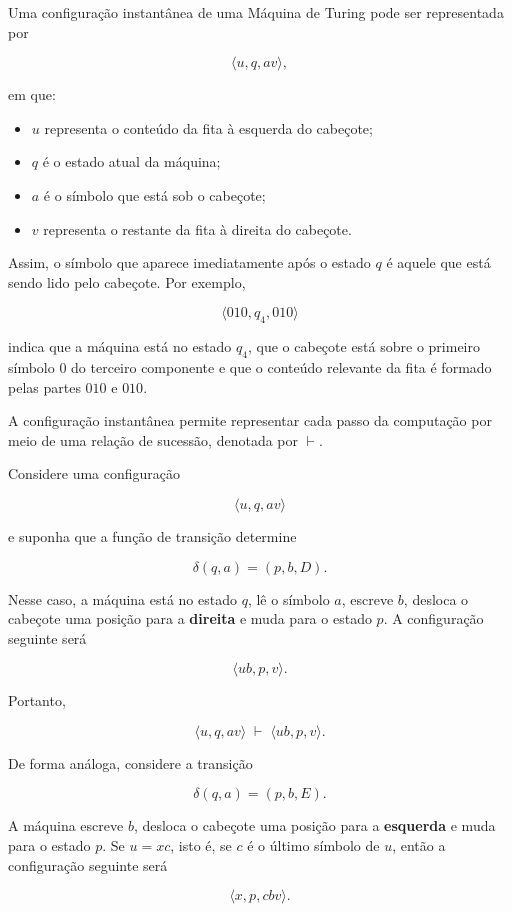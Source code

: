 \documentclass[
  brazilian,
  letterpaper,
]{book}
\providecommand{\tightlist}{%
  \setlength{\itemsep}{0pt}\setlength{\parskip}{0pt}}
\theoremstyle{plain}
\theoremstyle{definition}
\theoremstyle{remark}
\begin{document}
Uma configuração instantânea de uma Máquina de Turing pode ser
representada por

\[
\langle u,q,av\rangle,
\]

em que:

\begin{itemize}
\tightlist
\item
  \(u\) representa o conteúdo da fita à esquerda do cabeçote;
\item
  \(q\) é o estado atual da máquina;
\item
  \(a\) é o símbolo que está sob o cabeçote;
\item
  \(v\) representa o restante da fita à direita do cabeçote.
\end{itemize}

Assim, o símbolo que aparece imediatamente após o estado \(q\) é aquele
que está sendo lido pelo cabeçote. Por exemplo,

\[
\langle 010,q_4,010\rangle
\]

indica que a máquina está no estado \(q_4\), que o cabeçote está sobre o
primeiro símbolo \(0\) do terceiro componente e que o conteúdo relevante
da fita é formado pelas partes \(010\) e \(010\).

A configuração instantânea permite representar cada passo da computação
por meio de uma relação de sucessão, denotada por \(\vdash\).

Considere uma configuração

\[
\langle u,q,av\rangle
\]

e suponha que a função de transição determine

\[
\delta(q,a)=(p,b,D).
\]

Nesse caso, a máquina está no estado \(q\), lê o símbolo \(a\), escreve
\(b\), desloca o cabeçote uma posição para a \textbf{direita} e muda
para o estado \(p\). A configuração seguinte será

\[
\langle ub,p,v\rangle.
\]

Portanto,

\[
\langle u,q,av\rangle
\;\vdash\;
\langle ub,p,v\rangle.
\]

De forma análoga, considere a transição

\[
\delta(q,a)=(p,b,E).
\]

A máquina escreve \(b\), desloca o cabeçote uma posição para a
\textbf{esquerda} e muda para o estado \(p\). Se \(u=xc\), isto é, se
\(c\) é o último símbolo de \(u\), então a configuração seguinte será

\[
\langle x,p,cbv\rangle.
\]
\end{document}
